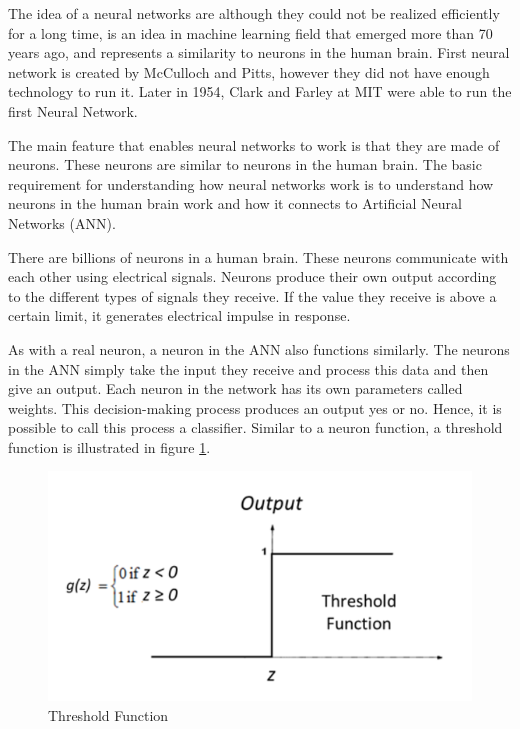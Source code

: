 The idea of a neural networks are although they could not be realized efficiently for a long time, is an idea in machine learning field that emerged more than 70 years ago, and represents a similarity to neurons in the human brain. First neural network is created by McCulloch and Pitts, however they did not have enough technology to run it. Later in 1954, Clark and Farley at MIT were able to run the first Neural Network.

The main feature that enables neural networks to work is that they are made of neurons. These neurons are similar to neurons in the human brain. The basic requirement for understanding how neural networks work is to understand how neurons in the human brain work and how it connects to Artificial Neural Networks (ANN).

There are billions of neurons in a human brain. These neurons communicate with each other using electrical signals. Neurons produce their own output according to the different types of signals they receive. If the value they receive is above a certain limit, it generates electrical impulse in response.

As with a real neuron, a neuron in the ANN also functions similarly. The neurons in the ANN simply take the input they receive and process this data and then give an output. Each neuron in the network has its own parameters called weights. This decision-making process produces an output yes or no. Hence, it is possible to call this process a classifier. Similar to a neuron function, a threshold function is illustrated in figure \ref{fig:threshold}.

\begin{figure}[h!]
    \centering
    \includegraphics[scale=0.7]{figures/chapter3/threshol.png}
    \caption{Threshold Function}
    \label{fig:threshold}
\end{figure}


